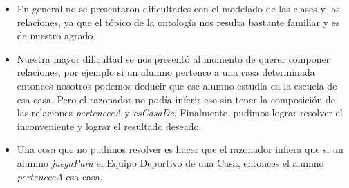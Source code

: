 \documentclass[11pt]{article}
\begin{document}
\begin{itemize}
    \item En general no se presentaron dificultades con el modelado de las clases
          y las relaciones, ya que el tópico de la ontología nos resulta bastante
          familiar y es de nuestro agrado.
    \item Nuestra mayor dificultad se nos presentó al momento de querer componer
          relaciones, por ejemplo si un alumno pertence a una casa determinada 
          entonces nosotros podemos deducir que ese alumno estudia en la escuela 
          de esa casa. Pero el razonador no podía inferir eso sin tener la
          composición de las relaciones \emph{perteneceA} y \emph{esCasaDe}. 
          Finalmente, pudimos lograr resolver el inconveniente y lograr el 
          resultado deseado.
    \item Una cosa que no pudimos resolver es hacer que el razonador infiera que
          si un alumno \emph{juegaPara} el Equipo Deportivo de una Casa, entonces
          el alumno \emph{perteneceA} esa casa. 
\end{itemize}
\end{document}
